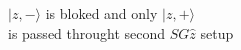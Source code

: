 \documentclass[preview]{standalone}
\begin{document}
\begin{center}
$ |z,-\rangle $ is bloked and only $ |z,+\rangle $ \\is passed throught second $ SG\hat{z} $ setup
\end{center}
\end{document}

